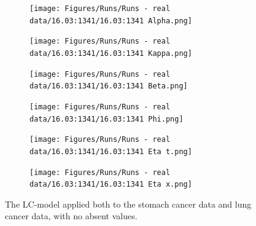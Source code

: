 \begin{figure}[h!]
    \centering
    \begin{subfigure}[b]{.45\linewidth}
        \texttt{[image: Figures/Runs/Runs - real data/16.03:1341/16.03:1341 Alpha.png]}
    \end{subfigure}
    \begin{subfigure}[b]{.45\linewidth}
        \texttt{[image: Figures/Runs/Runs - real data/16.03:1341/16.03:1341 Kappa.png]}
    \end{subfigure}
    
    \centering
    \begin{subfigure}[b]{.45\linewidth}
        \texttt{[image: Figures/Runs/Runs - real data/16.03:1341/16.03:1341 Beta.png]}
    \end{subfigure}
    \begin{subfigure}[b]{.45\linewidth}
        \texttt{[image: Figures/Runs/Runs - real data/16.03:1341/16.03:1341 Phi.png]}
    \end{subfigure}
    
    \centering
    \begin{subfigure}[b]{.45\linewidth}
        \texttt{[image: Figures/Runs/Runs - real data/16.03:1341/16.03:1341 Eta t.png]}
    \end{subfigure}
    \begin{subfigure}[b]{.45\linewidth}
        \texttt{[image: Figures/Runs/Runs - real data/16.03:1341/16.03:1341 Eta x.png]}
    \end{subfigure}

    \caption{The LC-model applied both to the stomach cancer data and lung cancer data, with no absent values. }
    \label{fig:LC-full-dataset}
\end{figure}

